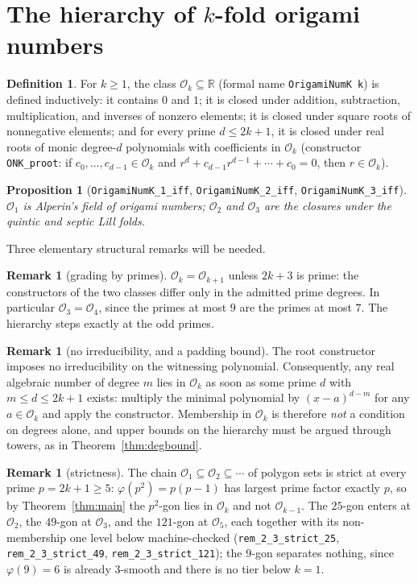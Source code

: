 \documentclass[11pt]{amsart}
\theoremstyle{plain}
\newtheorem{proposition}[theorem]{Proposition}
\theoremstyle{definition}
\newtheorem{definition}[theorem]{Definition}
\newtheorem{remark}[theorem]{Remark}
\newcommand{\Ok}{\mathscr{O}_k}
\newcommand{\Onum}[1]{\mathscr{O}_{#1}}
\newcommand{\R}{\mathbb{R}}
\newcommand{\code}[1]{\texttt{#1}}
\begin{document}
\section{The hierarchy of $k$-fold origami numbers}

\begin{definition}\label{def:onk}
For $k \ge 1$, the class $\Ok \subseteq \R$ (formal name \code{OrigamiNumK k}) is defined inductively: it contains $0$ and $1$; it is closed under addition, subtraction, multiplication, and inverses of nonzero elements; it is closed under square roots of nonnegative elements; and for every prime $d \le 2k+1$, it is closed under real roots of monic degree-$d$ polynomials with coefficients in $\Ok$ (constructor \code{ONK\_proot}: if $c_0,\dots,c_{d-1} \in \Ok$ and $r^d + c_{d-1}r^{d-1} + \cdots + c_0 = 0$, then $r \in \Ok$).
\end{definition}

\begin{proposition}[\code{OrigamiNumK\_1\_iff}, \code{OrigamiNumK\_2\_iff}, \code{OrigamiNumK\_3\_iff}]\label{prop:levels}
$\Onum{1}$ is Alperin's field of origami numbers; $\Onum{2}$ and $\Onum{3}$ are the closures under the quintic and septic Lill folds.
\end{proposition}

Three elementary structural remarks will be needed.

\begin{remark}[grading by primes]\label{rem:grading}
$\Ok = \Onum{k+1}$ unless $2k+3$ is prime: the constructors of the two classes differ only in the admitted prime degrees. In particular $\Onum{3} = \Onum{4}$, since the primes at most $9$ are the primes at most $7$. The hierarchy steps exactly at the odd primes.
\end{remark}

\begin{remark}[no irreducibility, and a padding bound]\label{rem:padding}
The root constructor imposes no irreducibility on the witnessing polynomial. Consequently, any real algebraic number of degree $m$ lies in $\Ok$ as soon as some prime $d$ with $m \le d \le 2k+1$ exists: multiply the minimal polynomial by $(x-a)^{d-m}$ for any $a \in \Ok$ and apply the constructor. Membership in $\Ok$ is therefore \emph{not} a condition on degrees alone, and upper bounds on the hierarchy must be argued through towers, as in Theorem~\ref{thm:degbound}.
\end{remark}

\begin{remark}[strictness]\label{rem:strict}
The chain $\Onum{1} \subseteq \Onum{2} \subseteq \cdots$ of polygon sets is strict at every prime $p = 2k+1 \ge 5$: $\varphi(p^2) = p(p-1)$ has largest prime factor exactly $p$, so by Theorem~\ref{thm:main} the $p^2$-gon lies in $\Onum{k}$ and not $\Onum{k-1}$. The $25$-gon enters at $\Onum{2}$, the $49$-gon at $\Onum{3}$, and the $121$-gon at $\Onum{5}$, each together with its non-membership one level below machine-checked (\code{rem\_2\_3\_strict\_25}, \code{rem\_2\_3\_strict\_49}, \code{rem\_2\_3\_strict\_121}); the $9$-gon separates nothing, since $\varphi(9)=6$ is already $3$-smooth and there is no tier below $k=1$.
\end{remark}
\end{document}
